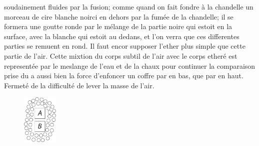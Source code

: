 soudainement fluides par la fusion; comme quand on fait fondre \`{a} la chandelle\protect{} un morceau de cire\protect{} blanche noirci en dehors par la fum\'{e}e\protect{} de la chandelle\protect{}; il se formera une goutte\protect{}
ronde par le m\'{e}lange de la partie noire qui estoit en la surface, avec la blanche qui estoit au dedans, et l'on verra que ces differentes parties se remuent en rond.
\pend%
\pstart%
Il faut encor supposer l'ether\protect{}
plus simple que cette partie de l'air. Cette mixtion du corps subtil de l'air avec le corps ether\'{e} est represent\'{e}e par le meslange de l'eau\protect{} et de la chaux\protect{} pour continuer la comparaison prise du \protect{}\protect{} a aussi bien la force d'enfoncer un coffre par en bas, que par en haut.
\pend%
\pstart%
Fermet\'{e}%
de la difficult\'{e} de lever la masse\protect{} de l'air.
\pend%
\pstart%
\begin{figure}
\includegraphics[trim = 0mm -3mm -5mm 0mm, clip, width=0.15\textwidth]{images/LBr719a_3-4_d1.pdf}\\
\noindent \centering{}\\
\end{figure}
